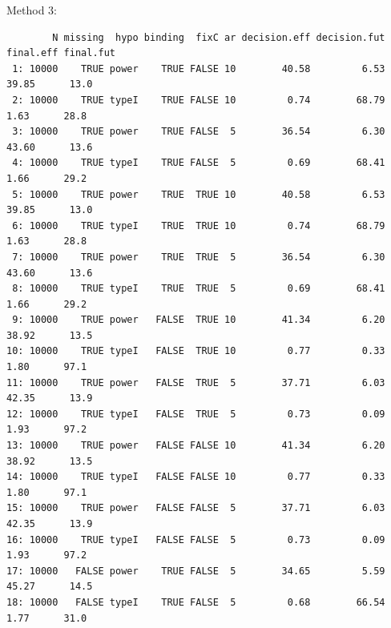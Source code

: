\documentclass[12pt]{article}
\begin{document}
Method 3:
\begin{verbatim}
        N missing  hypo binding  fixC ar decision.eff decision.fut final.eff final.fut
 1: 10000    TRUE power    TRUE FALSE 10        40.58         6.53     39.85      13.0
 2: 10000    TRUE typeI    TRUE FALSE 10         0.74        68.79      1.63      28.8
 3: 10000    TRUE power    TRUE FALSE  5        36.54         6.30     43.60      13.6
 4: 10000    TRUE typeI    TRUE FALSE  5         0.69        68.41      1.66      29.2
 5: 10000    TRUE power    TRUE  TRUE 10        40.58         6.53     39.85      13.0
 6: 10000    TRUE typeI    TRUE  TRUE 10         0.74        68.79      1.63      28.8
 7: 10000    TRUE power    TRUE  TRUE  5        36.54         6.30     43.60      13.6
 8: 10000    TRUE typeI    TRUE  TRUE  5         0.69        68.41      1.66      29.2
 9: 10000    TRUE power   FALSE  TRUE 10        41.34         6.20     38.92      13.5
10: 10000    TRUE typeI   FALSE  TRUE 10         0.77         0.33      1.80      97.1
11: 10000    TRUE power   FALSE  TRUE  5        37.71         6.03     42.35      13.9
12: 10000    TRUE typeI   FALSE  TRUE  5         0.73         0.09      1.93      97.2
13: 10000    TRUE power   FALSE FALSE 10        41.34         6.20     38.92      13.5
14: 10000    TRUE typeI   FALSE FALSE 10         0.77         0.33      1.80      97.1
15: 10000    TRUE power   FALSE FALSE  5        37.71         6.03     42.35      13.9
16: 10000    TRUE typeI   FALSE FALSE  5         0.73         0.09      1.93      97.2
17: 10000   FALSE power    TRUE FALSE  5        34.65         5.59     45.27      14.5
18: 10000   FALSE typeI    TRUE FALSE  5         0.68        66.54      1.77      31.0
\end{verbatim}
\end{document}
